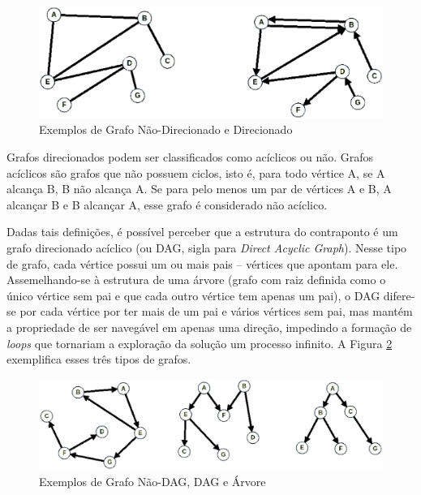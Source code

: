       \begin{figure}[htb]
        \centering
        \includegraphics[scale=0.47]{figuras/nodirxdir.eps}
        \caption{Exemplos de Grafo Não-Direcionado e Direcionado}
        \label{nodirxdir}
      \end{figure}

      Grafos direcionados podem ser classificados como acíclicos ou não. Grafos acíclicos são grafos que não possuem ciclos, isto é, para todo vértice A, se A alcança B, B não alcança A. Se para pelo menos um par de vértices A e B, A alcançar B e B alcançar A, esse grafo é considerado não acíclico.

      Dadas tais definições, é possível perceber que a estrutura do contraponto é um grafo direcionado acíclico (ou DAG, sigla para \textit{Direct Acyclic Graph}). Nesse tipo de grafo, cada vértice possui um ou mais pais -- vértices que apontam para ele. Assemelhando-se à estrutura de uma árvore (grafo com raiz definida como o único vértice sem pai e que cada outro vértice tem apenas um pai), o DAG difere-se por cada vértice por ter mais de um pai e vários vértices sem pai, mas mantém a propriedade de ser navegável em apenas uma direção, impedindo a formação de \textit{loops} que tornariam a exploração da solução um processo infinito. A Figura \ref{naodagdagarvore} exemplifica esses três tipos de grafos.

      \begin{figure}[htb]
        \centering
        \includegraphics[scale=0.47]{figuras/naodagdagarvore.eps}
        \caption{Exemplos de Grafo Não-DAG, DAG e Árvore}
        \label{naodagdagarvore}
      \end{figure}

